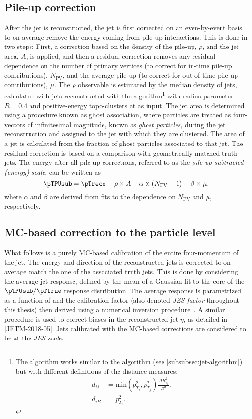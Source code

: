 \subsection{Pile-up correction}
After the jet is reconstructed, the jet \pTreco is first corrected on an even-by-event basis to on average remove the energy coming from pile-up interactions. This is done in two steps: First, a correction based on the \pT density of the pile-up, $\rho$, and the jet area, $A$, is applied, and then a residual correction removes any residual \pT dependence on the number of primary vertices (to correct for in-time pile-up contributions), $N_\text{PV}$, and the average pile-up (to correct for out-of-time pile-up contributions), $\mu$. 
The $\rho$ observable is estimated by the median \pT density of jets, calculated with jets reconstructed with the \kt algorithm\footnote{The \kt algorithm works similar to the \antikt algorithm (see \cref{subsubsec:jet-algorithm}) but with different definitions of the distance measures:
\begin{align*}
    d_{ij} &= \text{min}\left(p_{T_i}^2,p_{T_j}^2\right) \frac{\Delta R_{ij}^2}{R^2}, \\
    d_{iB} &= p_{T_i}^2.
    \label{eq:kt-distances}
\end{align*}
}
 with radius parameter $R = 0.4$ and positive-energy topo-clusters at  as input. The jet area is determined using a procedure known as ghost association, where particles are treated as four-vectors of infinitesimal magnitude, known as \emph{ghost particles}, during the jet reconstruction and assigned to the jet with which they are clustered. The area of a jet is calculated from the fraction of ghost particles associated to that jet.
The residual correction is based on a comparison with geometrically matched truth jets. The energy after all pile-up corrections, referred to as the \emph{pile-up subtracted (energy) scale}, can be written as
\begin{equation}
    \pTPUsub = \pTreco - \rho \times A - \alpha \times \left( N_{\text{PV}} - 1\right) - \beta \times \mu, 
\end{equation}
where $\alpha$ and $\beta$ are derived from fits to the \pT dependence on $N_{\text{PV}}$ and $\mu$, respectively.

\subsection{MC-based correction to the particle level}
What follows is a purely MC-based calibration of the entire four-momentum of the jet. The energy and direction of the reconstructed jets is corrected to on average match the one of the associated truth jets. This is done by considering the average jet response, defined by the mean of a Gaussian fit to the core of the $\pTPUsub / \pTtrue$ response distribution. The average response is parametrized as a function of \pTPUsub and the \pT calibration factor (also denoted \emph{JES factor} throughout this thesis) then derived using a numerical inversion procedure~\cite{PERF-2011-03}. A similar procedure is used to correct biases in the reconstructed jet $\eta$, as detailed in \cref{JETM-2018-05}. 
Jets calibrated with the MC-based corrections are considered to be at the \emph{JES scale}.

